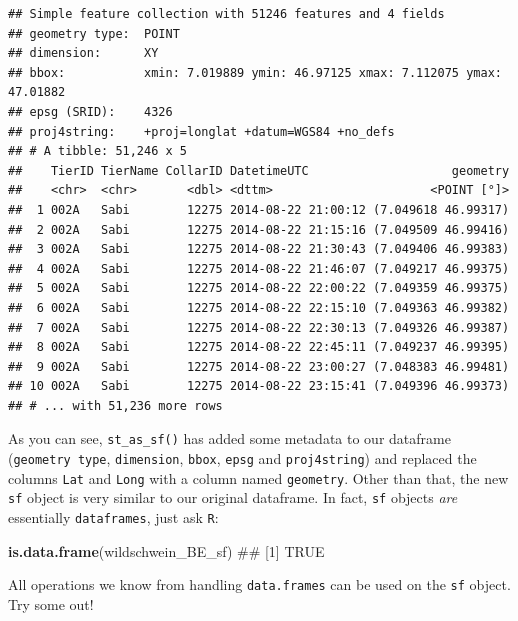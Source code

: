 \documentclass[]{book}
\newenvironment{Shaded}{\begin{snugshade}}{\end{snugshade}}
\newcommand{\KeywordTok}[1]{\textcolor[rgb]{0.13,0.29,0.53}{\textbf{#1}}}
\newcommand{\DecValTok}[1]{\textcolor[rgb]{0.00,0.00,0.81}{#1}}
\newcommand{\StringTok}[1]{\textcolor[rgb]{0.31,0.60,0.02}{#1}}
\newcommand{\CommentTok}[1]{\textcolor[rgb]{0.56,0.35,0.01}{\textit{#1}}}
\newcommand{\OperatorTok}[1]{\textcolor[rgb]{0.81,0.36,0.00}{\textbf{#1}}}
\newcommand{\NormalTok}[1]{#1}
\begin{document}
\begin{verbatim}
## Simple feature collection with 51246 features and 4 fields
## geometry type:  POINT
## dimension:      XY
## bbox:           xmin: 7.019889 ymin: 46.97125 xmax: 7.112075 ymax: 47.01882
## epsg (SRID):    4326
## proj4string:    +proj=longlat +datum=WGS84 +no_defs
## # A tibble: 51,246 x 5
##    TierID TierName CollarID DatetimeUTC                    geometry
##    <chr>  <chr>       <dbl> <dttm>                      <POINT [°]>
##  1 002A   Sabi        12275 2014-08-22 21:00:12 (7.049618 46.99317)
##  2 002A   Sabi        12275 2014-08-22 21:15:16 (7.049509 46.99416)
##  3 002A   Sabi        12275 2014-08-22 21:30:43 (7.049406 46.99383)
##  4 002A   Sabi        12275 2014-08-22 21:46:07 (7.049217 46.99375)
##  5 002A   Sabi        12275 2014-08-22 22:00:22 (7.049359 46.99375)
##  6 002A   Sabi        12275 2014-08-22 22:15:10 (7.049363 46.99382)
##  7 002A   Sabi        12275 2014-08-22 22:30:13 (7.049326 46.99387)
##  8 002A   Sabi        12275 2014-08-22 22:45:11 (7.049237 46.99395)
##  9 002A   Sabi        12275 2014-08-22 23:00:27 (7.048383 46.99481)
## 10 002A   Sabi        12275 2014-08-22 23:15:41 (7.049396 46.99373)
## # ... with 51,236 more rows
\end{verbatim}

As you can see, \texttt{st\_as\_sf()} has added some metadata to our
dataframe (\texttt{geometry\ type}, \texttt{dimension}, \texttt{bbox},
\texttt{epsg} and \texttt{proj4string}) and replaced the columns
\texttt{Lat} and \texttt{Long} with a column named \texttt{geometry}.
Other than that, the new \texttt{sf} object is very similar to our
original dataframe. In fact, \texttt{sf} objects \emph{are} essentially
\texttt{dataframes}, just ask \texttt{R}:

\begin{Shaded}
\begin{Highlighting}[]
\KeywordTok{is.data.frame}\NormalTok{(wildschwein_BE_sf)}
\NormalTok{## [1] TRUE}
\end{Highlighting}
\end{Shaded}

All operations we know from handling \texttt{data.frames} can be used on
the \texttt{sf} object. Try some out!

\begin{Shaded}
\end{Shaded}
\end{document}

